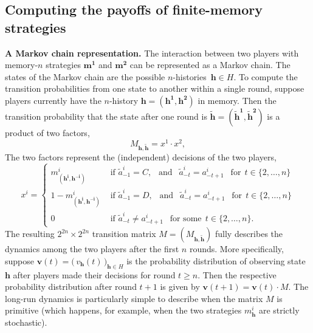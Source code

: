 \documentclass[9pt,twoside,lineno]{pnas-new}
\theoremstyle{plainCl1}
\theoremstyle{plainCl2}
\begin{document}
\subsection{Computing the payoffs of finite-memory strategies} \label{Sec:PayoffComputation}


{\bf A Markov chain representation.}
The interaction between two players with memory-\(n\) strategies \(\mathbf{m^{1}}\) and \(\mathbf{m^{2}}\) can be represented as a Markov chain. 
The states of the Markov chain are the possible $n$-histories~$\mathbf{h}\!\in\!H$. 
To compute the transition probabilities from one state to another within a single round, suppose  players currently have the $n$-history \(\mathbf{h}\!=\!(\mathbf{h^1}, \mathbf{h^2})\) in memory.
Then the transition probability that the state after one round is $\mathbf{\tilde h}\!=\!(\mathbf{\tilde h^1},\mathbf{\tilde h^2})$ is a product of two factors,
\begin{equation}\label{Eq:TransitionMatrix}
M_{\mathbf{h}, \mathbf{\tilde h}} = x^1 \cdot x^2,
\end{equation}
The two factors represent the (independent) decisions of the two players,
\begin{equation}
x^i = \left\{
\begin{array}{ll}
  m^{i}_{(\mathbf{h^i},\mathbf{h^{-i}})} & \text{ if } \tilde{a}^i_{-1} \!=\! C, ~~\text{ and }~~ \tilde a^i_{-t} \!=\! a^i_{-t + 1} ~~\text{ for}~~t\!\in\!\{2,\ldots,n\}\\[0.1cm]
  1 \!-\! m^{i}_{(\mathbf{h^i},\mathbf{h^{-i}})} & \text{ if } \tilde{a}^i_{-1} \!=\! D, ~~\text{ and }~~ \tilde a^i_{-t} \!=\! a^i_{-t + 1} ~~\text{ for}~~t\!\in\!\{2,\ldots,n\}\\[0.1cm]
  0 & \text{ if } \tilde a^i_{-t} \neq  a^i_{-t + 1}~~\text{ for some}~~t\!\in\!\{2,\ldots,n\}.
\end{array}
\right.
\end{equation}
The resulting  \(2^{2n} \times 2^{2n}\) transition matrix $M\!=\!(M_{\mathbf{h},\mathbf{\tilde h}})$ fully describes the dynamics among the two players after the first $n$ rounds. 
More specifically, suppose $\mathbf{v}(t) \!=\! \big(\,v_\mathbf{h}(t)\,\big)_{\mathbf{h}\in H}$ is the probability distribution of observing state~$\mathbf{h}$ after players made their decisions for round $t\!\ge\!n$.
Then the respective probability distribution after round $t\!+\!1$ is given by $\mathbf{v}(t\!+\!1) \!=\! \mathbf{v}(t)\cdot M$. 
The long-run dynamics is particularly simple to describe when the matrix $M$ is primitive (which happens, for example, when the two strategies $m^i_\mathbf{h}$ are strictly stochastic). 
\end{document}
